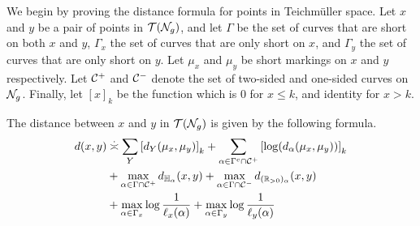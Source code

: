 \documentclass[12pt, reqno]{amsart}
\begin{document}
We begin by proving the distance formula for points in Teichmüller space.
Let $x$ and $y$ be a pair of points in $\mathcal{T}(\mathcal{N}_g)$, and let $\Gamma$ be the set of curves that are short on both $x$ and $y$, $\Gamma_x$ the set of curves that are only short on $x$, and $\Gamma_y$ the set of curves that are only short on $y$.
Let $\mu_x$ and $\mu_y$ be short markings on $x$ and $y$ respectively.
Let $\mathcal{C}^+$ and $\mathcal{C}^-$ denote the set of two-sided and one-sided curves on $\mathcal{N}_g$.
Finally, let $\left[ x \right]_k$ be the function which is $0$ for $x \leq k$, and identity for $x > k$.

\begin{theorem}
  \label{thm:distance-formula}
  The distance between $x$ and $y$ in $\mathcal{T}(\mathcal{N}_g)$ is given by the following formula.
  \begin{equation}
  \begin{aligned}
    d(x, y) &\emul \sum_{Y} \left[ d_Y(\mu_x, \mu_y) \right]_k + \sum_{\alpha \in \Gamma^c \cap \cC^+} \left[ \log(d_{\alpha}(\mu_x, \mu_y)) \right]_k \\
    &+ \max_{\alpha \in \Gamma \cap \cC^+} d_{\mathbb{H}_{\alpha}}(x, y) + \max_{\alpha \in \Gamma \cap \cC^-} d_{(\mathbb{R}_{>0})_{\alpha}}(x, y) \\
    &+ \max_{\alpha \in \Gamma_x} \log \frac{1}{\ell_x(\alpha)} + \max_{\alpha \in \Gamma_y} \log \frac{1}{\ell_y(\alpha)}
  \end{aligned}
  \label{eq:distance-formula-nonorient}
  \end{equation}
\end{theorem}
\end{document}
